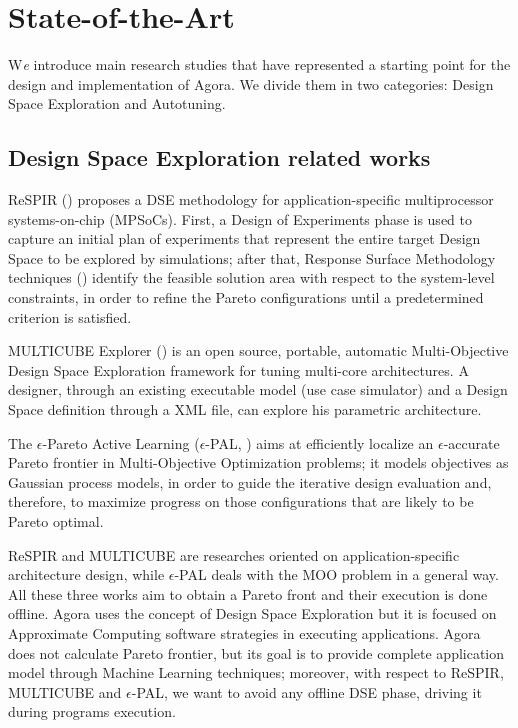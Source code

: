 \chapter{State-of-the-Art}\label{sota}

\lettrine{W}{}\textit{e} introduce main research studies that have represented a starting point for the design and implementation of A\-go\-ra. We divide them in two categories: Design Space Exploration and Autotuning.

\section{Design Space Exploration related works}

ReSPIR (\cite{palermo2009respir}) proposes a DSE methodology for application-spe\-cif\-ic multiprocessor systems-on-chip (MPSoCs). First, a Design of Experiments phase is used to capture an initial plan of experiments that represent the entire target Design Space to be explored by simulations; after that, Response Surface Methodology techniques (\cite{khuri2010response}) identify the feasible solution area with respect to the system-level constraints, in order to refine the Pareto configurations until a predetermined criterion is satisfied.

MULTICUBE Explorer (\cite{silvano2011multicube}) is an open source, portable, automatic Multi-Objective Design Space Exploration framework for tuning multi-core architectures. A designer, through an existing executable model (use case simulator) and a Design Space definition through a XML file, can explore his parametric architecture.

The $\epsilon$-Pareto Active Learning ($\epsilon$-PAL, \cite{zuluaga2016e}) aims at efficiently localize an $\epsilon$-accurate Pareto frontier in Multi-Objective Optimization problems; it models objectives as Gaussian process models, in order to guide the iterative design evaluation and, therefore, to maximize progress on those configurations that are likely to be Pareto optimal.

ReSPIR and MULTICUBE are researches oriented on ap\-pli\-ca\-tion-specific architecture design, while $\epsilon$-PAL deals with the MOO problem in a general way. All these three works aim to obtain a Pareto front and their execution is done offline. Agora uses the concept of Design Space Exploration but it is focused on Approximate Computing software strategies in executing applications. Agora does not calculate Pareto frontier, but its goal is to provide complete application model through Machine Learning techniques; moreover, with respect to ReSPIR, MULTICUBE and $\epsilon$-PAL, we want to avoid any offline DSE phase, driving it during programs execution.


